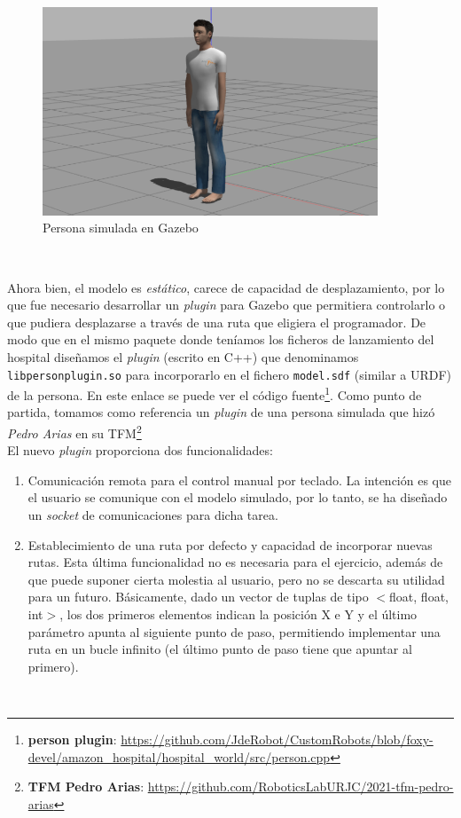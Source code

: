 \begin{figure} [H]
  \begin{center}
    \includegraphics[width=10cm]{imagenes/cap5/person_model.png}
  \end{center}
  \caption[Persona simulada en Gazebo]{Persona simulada en Gazebo}
  \label{fig:persona_gazebo}
\end{figure}\

Ahora bien, el modelo es \textit{estático}, carece de capacidad de desplazamiento, por lo que fue necesario desarrollar un \textit{plugin} para Gazebo que permitiera controlarlo o que pudiera desplazarse a través de una ruta que eligiera el programador. De modo que en el mismo paquete donde teníamos los ficheros de lanzamiento del hospital diseñamos el \textit{plugin} (escrito en C++) que denominamos \texttt{libpersonplugin.so} para incorporarlo en el fichero \texttt{model.sdf} (similar a URDF) de la persona. En este enlace se puede ver el código fuente\footnote{\textbf{person plugin}: \url{https://github.com/JdeRobot/CustomRobots/blob/foxy-devel/amazon_hospital/hospital_world/src/person.cpp}}. Como punto de partida, tomamos como referencia un \textit{plugin} de una persona simulada que hizó \textit{Pedro Arias} en su TFM\footnote{\textbf{TFM Pedro Arias}: \url{https://github.com/RoboticsLabURJC/2021-tfm-pedro-arias}}\\

El nuevo \textit{plugin} proporciona dos funcionalidades:
\begin{enumerate}
	\item Comunicación remota para el control manual por teclado. La intención es que el usuario se comunique con el modelo simulado, por lo tanto, se ha diseñado un \textit{socket} de comunicaciones para dicha tarea.
	\item Establecimiento de una ruta por defecto y capacidad de incorporar nuevas rutas. Esta última funcionalidad no es necesaria para el ejercicio, además de que puede suponer cierta molestia al usuario, pero no se descarta su utilidad para un futuro. Básicamente, dado un vector de tuplas de tipo $<$float, float, int$>$, los dos primeros elementos indican la posición X e Y y el último parámetro apunta al siguiente punto de paso, permitiendo implementar una ruta en un bucle infinito (el último punto de paso tiene que apuntar al primero).
\end{enumerate}\




